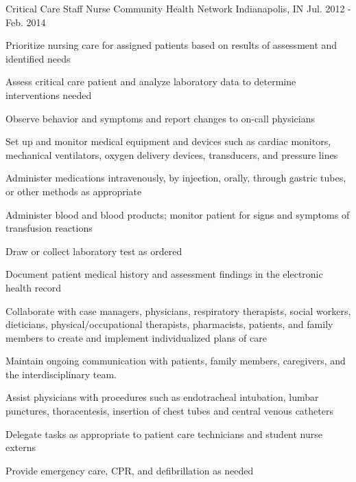 \begin{cventries}
  \cventry
    {Critical Care Staff Nurse} %
    {Community Health Network} %
    {Indianapolis, IN} %
    {Jul. 2012 - Feb. 2014} %
    {
      \begin{cvitems} %
        \item {Prioritize nursing care for assigned patients based on results of assessment and identified needs}
        \item {Assess critical care patient and analyze laboratory data to determine interventions needed}
        \item {Observe behavior and symptoms and report changes to on-call physicians}
        \item {Set up and monitor medical equipment and devices such as cardiac monitors, mechanical ventilators, oxygen delivery devices, transducers, and pressure lines}
        \item {Administer medications intravenously, by injection, orally, through gastric tubes, or other methods as appropriate}
        \item {Administer blood and blood products; monitor patient for signs and symptoms of transfusion reactions}
        \item {Draw or collect laboratory test as ordered}
        \item {Document patient medical history and assessment findings in the electronic health record}
        \item {Collaborate with case managers, physicians, respiratory therapists, social workers, dieticians, physical/occupational therapists, pharmacists, patients, and family members to create and implement individualized plans of care}
        \item {Maintain ongoing communication with patients, family members, caregivers, and the interdisciplinary team.}
        \item {Assist physicians with procedures such as endotracheal intubation, lumbar punctures, thoracentesis, insertion of chest tubes and central venous catheters}
        \item {Delegate tasks as appropriate to patient care technicians and student nurse externs}
        \item {Provide emergency care, CPR, and defibrillation as needed}
      \end{cvitems}
    }


\end{cventries}
